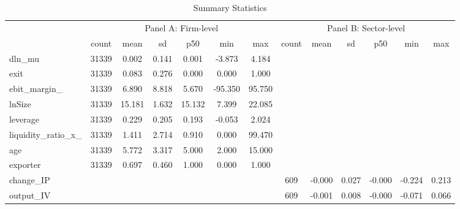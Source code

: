 \begin{table}[htbp]\centering
\def\sym#1{\ifmmode^{#1}\else\(^{#1}\)\fi}
\caption{Summary Statistics}
\begin{tabular}{l*{2}{cccccc}}
\hline\hline
            &\multicolumn{6}{c}{Panel A: Firm-level}                                      &\multicolumn{6}{c}{Panel B: Sector-level}                                    \\
            &       count&        mean&          sd&         p50&         min&         max&       count&        mean&          sd&         p50&         min&         max\\
\hline
dln\_mu      &       31339&       0.002&       0.141&       0.001&      -3.873&       4.184&            &            &            &            &            &            \\
exit        &       31339&       0.083&       0.276&       0.000&       0.000&       1.000&            &            &            &            &            &            \\
ebit\_margin\_&       31339&       6.890&       8.818&       5.670&     -95.350&      95.750&            &            &            &            &            &            \\
lnSize      &       31339&      15.181&       1.632&      15.132&       7.399&      22.085&            &            &            &            &            &            \\
leverage    &       31339&       0.229&       0.205&       0.193&      -0.053&       2.024&            &            &            &            &            &            \\
liquidity\_ratio\_x\_&       31339&       1.411&       2.714&       0.910&       0.000&      99.470&            &            &            &            &            &            \\
age         &       31339&       5.772&       3.317&       5.000&       2.000&      15.000&            &            &            &            &            &            \\
exporter    &       31339&       0.697&       0.460&       1.000&       0.000&       1.000&            &            &            &            &            &            \\
change\_IP   &            &            &            &            &            &            &         609&      -0.000&       0.027&      -0.000&      -0.224&       0.213\\
output\_IV   &            &            &            &            &            &            &         609&      -0.001&       0.008&      -0.000&      -0.071&       0.066\\

\end{tabular}
\end{table}
